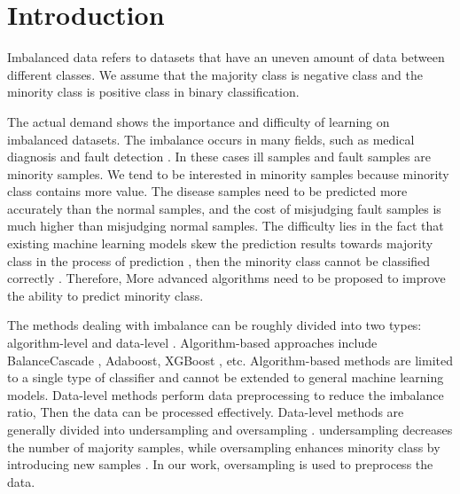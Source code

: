 \documentclass[runningheads]{llncs}
\begin{document}
\section{Introduction}
Imbalanced data\cite{2004Editorial} refers to datasets that have an uneven 
amount of data between different classes. 
We assume that the majority class is negative class and 
the minority class is positive class in binary classification.

The actual demand shows the importance and difficulty of learning on imbalanced datasets.
The imbalance occurs in many fields, such as medical 
diagnosis \cite{2013Computational,2019Electrocardiogram} and fault detection \cite{2018Imbalanced}.
In these cases ill samples and fault samples are minority samples.
We tend to be interested in minority samples because minority class contains more value. 
The disease samples need to be predicted more accurately than the normal samples, 
and the cost of misjudging fault samples is much higher than misjudging normal samples.
The difficulty %
lies in the fact that existing machine 
learning models skew the prediction results towards 
majority class in the process of prediction \cite{Victoria2013An}, then 
the minority class cannot be classified correctly \cite{2016A}. 
Therefore, More advanced algorithms need to 
be proposed to improve the ability to predict minority class.

The methods dealing with imbalance can be roughly
divided into two types: algorithm-level \cite{2007Highcost-sensitive} and data-level \cite{2002SMOTE}.
Algorithm-based approaches include BalanceCascade \cite{2019Class}, Adaboost, 
XGBoost \cite{Chen_2016}, etc. 
Algorithm-based methods are limited 
to a single type of classifier \cite{2020Combined} and 
cannot be extended to general machine learning models.
Data-level methods perform data preprocessing to reduce the imbalance ratio, Then 
the data can be processed effectively.
Data-level methods are generally divided into undersampling \cite{2015Undersampled} 
and oversampling \cite{2002SMOTE}. 
undersampling decreases the number of majority samples, %
while oversampling enhances minority class by introducing new samples \cite{2010A}.
In our work, oversampling is used to preprocess the data.
\end{document}

